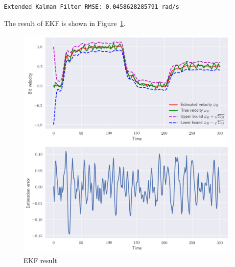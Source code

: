 \documentclass[12pt]{article}
\begin{document}

\begin{Verbatim}
Extended Kalman Filter RMSE: 0.0458628285791 rad/s
\end{Verbatim}
The result of EKF is shown in Figure~\ref{fig:6}.
\begin{figure}[H]
	\centering
	\includegraphics[width=\linewidth]{6.png}      
	\caption{EKF result}
	\label{fig:6}
\end{figure}
\end{document}
